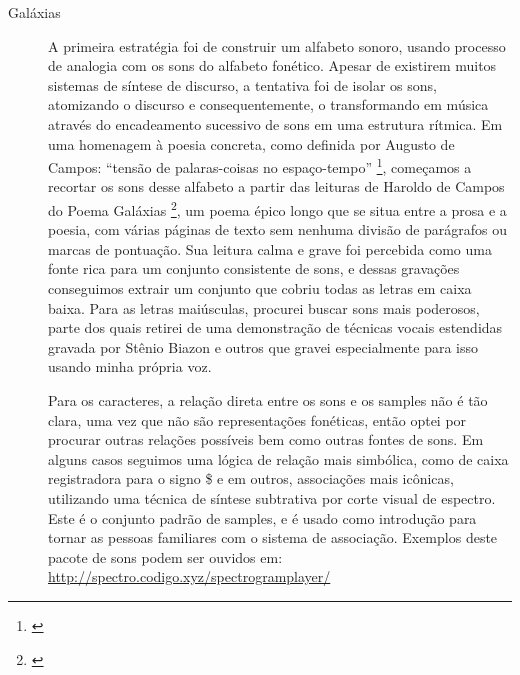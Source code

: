 \begin{description}
 \item[Galáxias] A primeira estratégia foi de construir um alfabeto sonoro, usando processo de analogia com os sons do alfabeto fonético. Apesar de existirem muitos sistemas de síntese de discurso, a tentativa foi de isolar os sons, atomizando o discurso e consequentemente, o transformando em música através do encadeamento sucessivo de sons em uma estrutura rítmica. 
Em uma homenagem à poesia concreta, como definida por Augusto de Campos: ``tensão de palaras-coisas no espaço-tempo'' \footnote{\cite[45]{campos_teoria_2014}}, começamos a recortar os sons desse alfabeto a partir das leituras de Haroldo de Campos do Poema Galáxias \footnote{\cite{Campos2004}}, um poema épico longo que se situa entre a prosa e a poesia, com várias páginas de texto sem nenhuma divisão de parágrafos ou marcas de pontuação. Sua leitura calma e grave foi percebida como uma fonte rica para um conjunto consistente de sons, e dessas gravações conseguimos extrair um conjunto que cobriu todas as letras em caixa baixa. Para as letras maiúsculas, procurei buscar sons mais poderosos, parte dos quais retirei de uma demonstração de técnicas vocais estendidas gravada por Stênio Biazon e outros que gravei especialmente para isso usando minha própria voz.  

Para os caracteres, a relação direta entre os sons e os samples não é tão clara, uma vez que não são representações fonéticas, então optei por procurar outras relações possíveis bem como outras fontes de sons. Em alguns casos seguimos uma lógica de relação mais simbólica, como de caixa registradora para o signo \$ e em outros, associações mais icônicas, utilizando uma técnica de síntese subtrativa por corte visual de espectro. Este é o conjunto padrão de samples, e é usado como introdução para tornar as pessoas familiares com o sistema de associação. Exemplos deste pacote de sons podem ser ouvidos em: \url{http://spectro.codigo.xyz/spectrogramplayer/}


\end{description}

